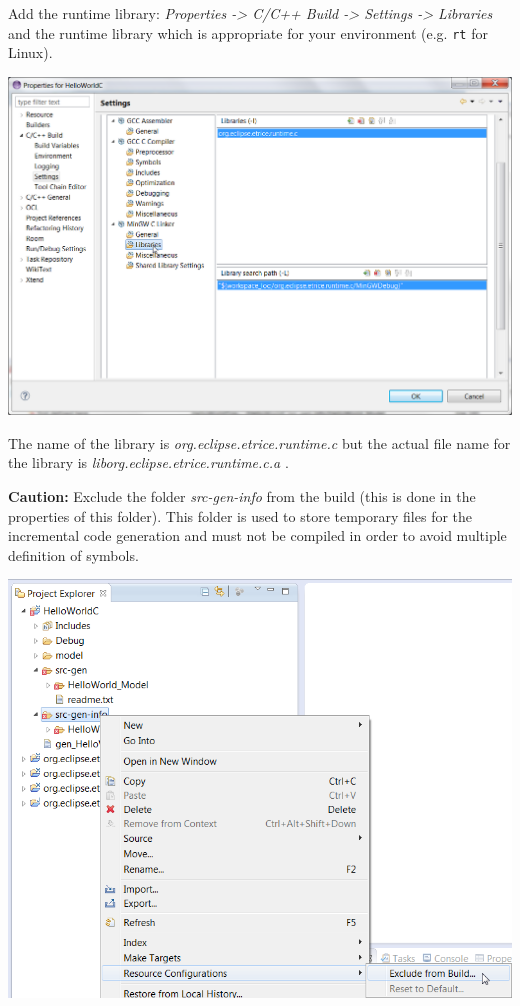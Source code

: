 Add the runtime library: \textit{Properties -> C/C++ Build -> Settings -> Libraries} and the runtime library which is appropriate for your
environment (e.g. \texttt{rt} for Linux).

\includegraphics{images/016-HelloWorldC15.png}

The name of the library is \emph{org.eclipse.etrice.runtime.c} but the actual file name for the library is \emph{liborg.eclipse.etrice.runtime.c.a} .

\textbf{Caution:} Exclude the folder \emph{src-gen-info} from the build (this is done in the properties of this folder).
This folder is used to store temporary files for the incremental code generation and must not be compiled in order to avoid multiple definition of symbols.

\includegraphics{images/016-HelloWorldC151.png}

